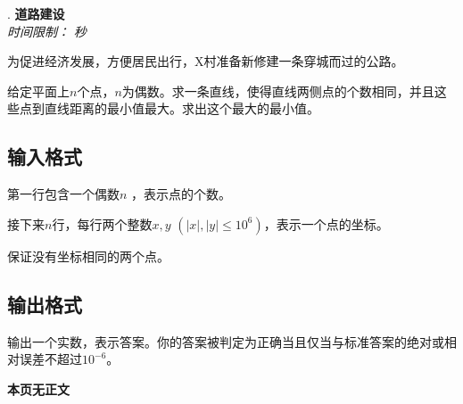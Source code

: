 \addtocounter{ProblemNo}{1}
\renewcommand{\ProblemName}{道路建设}
\begin{center}
\huge{. \textbf{\ProblemName}} \\ [0.8cm]
\large{\textit{时间限制：}  \textit{秒}} \\ [1cm]
\end{center}

为促进经济发展，方便居民出行，X村准备新修建一条穿城而过的公路。

给定平面上$n$个点，$n$为偶数。求一条直线，使得直线两侧点的个数相同，并且这些点到直线距离的最小值最大。求出这个最大的最小值。

\subsection*{输入格式}

第一行包含一个偶数$n$ ，表示点的个数。

接下来$n$行，每行两个整数$x, y$ $(|x|, |y| \leq 10^6)$，表示一个点的坐标。

保证没有坐标相同的两个点。

\subsection*{输出格式}

输出一个实数，表示答案。你的答案被判定为正确当且仅当与标准答案的绝对或相对误差不超过$10^{-6}$。

\setcounter{ExampleNo}{0}


\clearpage

\ifodd\value{page}
\else
    \vspace*{\fill}
    \begin{center}
    \textbf{\Large 本页无正文}
    \end{center}
    \vspace*{\fill}
    \clearpage
\fi

